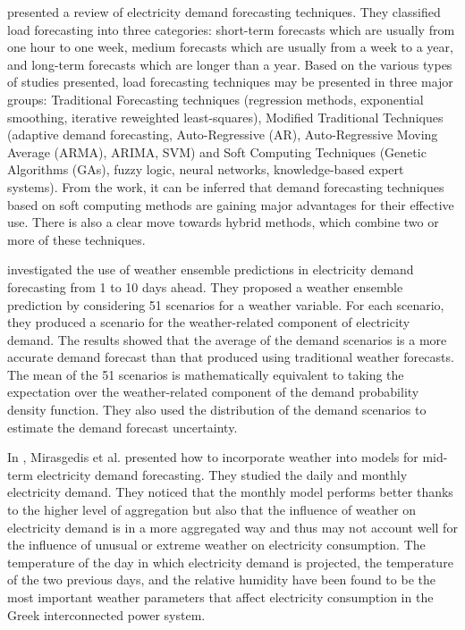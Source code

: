 \cite{singh2013overview} presented a review of electricity demand forecasting techniques.
They classified load forecasting into three categories:
short-term forecasts which are usually from one hour to one week,
medium forecasts which are usually from a week to a year,
and long-term forecasts which are longer than a year.
Based on the various types of studies presented, load forecasting techniques may be presented in three major groups: Traditional Forecasting techniques (regression methods, exponential smoothing, iterative reweighted least-squares), Modified Traditional Techniques (adaptive demand forecasting, Auto-Regressive (AR), Auto-Regressive Moving Average (ARMA), ARIMA, SVM) and Soft Computing Techniques (Genetic Algorithms (GAs), fuzzy logic, neural networks, knowledge-based expert systems).
From the work, it can be inferred that demand forecasting techniques based on soft computing methods are gaining major advantages for their effective use.
There is also a clear move towards hybrid methods, which combine two or more of these techniques.

\cite{TAYLOR200357} investigated the use of weather ensemble predictions in electricity demand forecasting from 1 to 10 days ahead.
They proposed a weather ensemble prediction by considering 51 scenarios for a weather variable.
For each scenario, they produced a scenario for the weather-related component of electricity demand.
The results showed that the average of the demand scenarios is a more accurate demand forecast than that produced using traditional weather forecasts.
The mean of the 51 scenarios is mathematically equivalent to taking the expectation over the weather-related component of the demand probability density function.
They also used the distribution of the demand scenarios to estimate the demand forecast uncertainty.

In \cite{MIRASGEDIS2006208}, Mirasgedis et al. presented how to incorporate weather into models for mid-term electricity demand forecasting.
They studied the daily and monthly electricity demand.
They noticed that the monthly model performs better thanks to the higher level of aggregation but also that the influence of weather on electricity demand is in a more aggregated way and thus may not account well for the influence of unusual or extreme weather on electricity consumption.
The temperature of the day in which electricity demand is projected, the temperature of the two previous days, and the relative humidity have been found to be the most important weather parameters that affect electricity consumption in the Greek interconnected power system.

